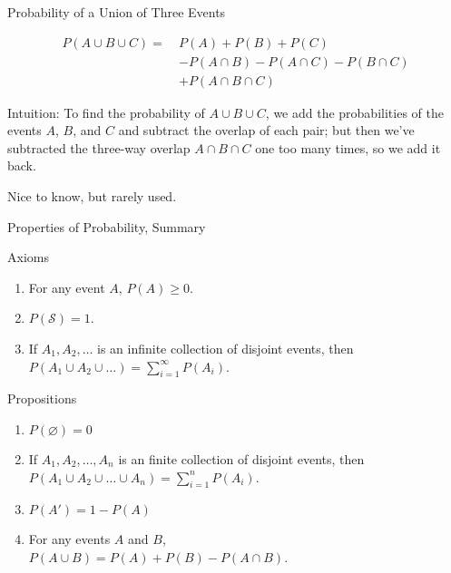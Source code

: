 \documentclass{beamer}
\let\emptyset\varnothing
\begin{document}
\begin{frame}{Probability of a Union of Three Events}
    \begin{block}{}
        \vspace{-.2in}\begin{align*}
            P(A \cup B \cup C) = \  & P(A)+P(B)+P(C)                         \\
                                    & -P(A \cap B)-P(A \cap C) - P(B \cap C) \\
                                    & + P(A\cap B\cap C)
        \end{align*}
    \end{block}

    Intuition: To find the probability of $A \cup B \cup C$, we add the probabilities of the events $A$, $B$, and $C$ and subtract the overlap of each pair; but then we've subtracted the three-way overlap $A \cap B \cap C$ one too many times, so we add it back.
    \begin{center}
        Nice to know, but rarely used.
    \end{center}
\end{frame}

\begin{frame}{Properties of Probability, Summary}
    \begin{block}{Axioms}
        \begin{enumerate}
            \item For any event $A$, $P(A) \geq 0$.
            \item $P(\mathcal{S})=1$.
            \item If $A_1, A_2, \ldots $ is an infinite collection of disjoint events, then
                  $P(A_1 \cup A_2 \cup \ldots) = \sum_{i=1}^\infty P(A_i)$.
        \end{enumerate}
    \end{block}
    \begin{block}{Propositions}
        \begin{enumerate}
            \item $P(\emptyset)=0$
            \item If $A_1, A_2, \ldots, A_n $ is an finite collection of disjoint events, then
            $P(A_1 \cup A_2 \cup \ldots \cup A_n) = \sum_{i=1}^n P(A_i)$.
            \item $P(A') = 1 -P(A)$
            \item For any events $A$ and $B$, \\$P(A\cup B) = P(A) + P(B) - P(A\cap B)$.
        \end{enumerate}
    \end{block}
\end{frame}
\end{document}
